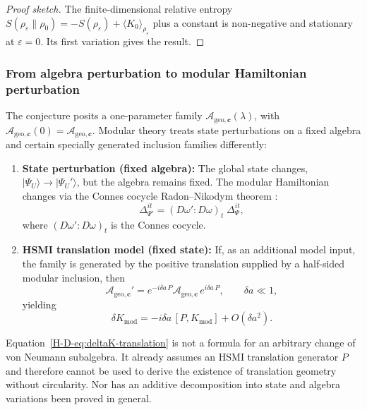 \documentclass[12pt,a4paper,openany]{book}
\begin{document}
\begin{proof}[Proof sketch]
The finite-dimensional relative entropy $S(\rho_\varepsilon\|\rho_0)=-S(\rho_\varepsilon)+\langle K_0\rangle_{\rho_\varepsilon}$ plus a constant is non-negative and stationary at $\varepsilon=0$.  Its first variation gives the result.
\end{proof}

\subsubsection{From algebra perturbation to modular Hamiltonian perturbation}

The conjecture posits a one-parameter family $\mathcal{A}_{\mathrm{geo},\mathbf{c}}(\lambda)$, with $\mathcal{A}_{\mathrm{geo},\mathbf{c}}(0)=\mathcal{A}_{\mathrm{geo},\mathbf{c}}$.  Modular theory treats state perturbations on a fixed algebra and certain specially generated inclusion families differently:

\begin{enumerate}
\item[(a)] \textbf{State perturbation (fixed algebra):} The global state changes, $|\Psi_U\rangle \to |\Psi_U'\rangle$, but the algebra remains fixed.
The modular Hamiltonian changes via the Connes cocycle Radon--Nikodym theorem \cite{Connes1994, Takesaki2003}:
\begin{equation}
\Delta_{\Psi'}^{it} = (D\omega' : D\omega)_t \; \Delta_\Psi^{it},
\end{equation}
where $(D\omega' : D\omega)_t$ is the Connes cocycle.

\item[(b)] \textbf{HSMI translation model (fixed state):} If, as an additional model input, the family is generated by the positive translation supplied by a half-sided modular inclusion, then
\begin{equation}
\mathcal{A}_{\mathrm{geo},\mathbf{c}}' = e^{-i\delta a\, P} \mathcal{A}_{\mathrm{geo},\mathbf{c}}\, e^{i\delta a\, P}, \qquad \delta a \ll 1,
\end{equation}
yielding
\begin{equation}
\label{H-D-eq:deltaK-translation}
\delta K_{\mathrm{mod}} = -i\delta a\, [P, K_{\mathrm{mod}}] + O(\delta a^2).
\end{equation}
\end{enumerate}

Equation~\eqref{H-D-eq:deltaK-translation} is not a formula for an arbitrary change of von Neumann subalgebra.  It already assumes an HSMI translation generator $P$ and therefore cannot be used to derive the existence of translation geometry without circularity.  Nor has an additive decomposition into state and algebra variations been proved in general.
\end{document}
